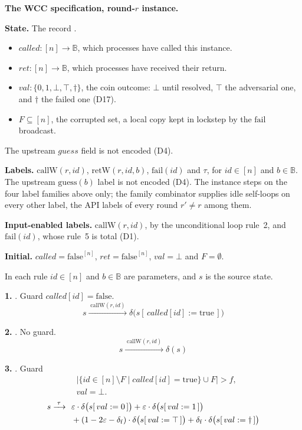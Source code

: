 \noindent\textbf{The WCC specification, round-$r$ instance.}

\medskip
\noindent\textbf{State.} The record .
\begin{itemize}
  \item $called : [n] \to \mathbb{B}$, which processes have called this instance.
  \item $ret : [n] \to \mathbb{B}$, which processes have received their return.
  \item $val : \{0,1,\bot,\top,\dagger\}$, the coin outcome: $\bot$ until resolved, $\top$ the adversarial one, and $\dagger$ the failed one (D17).
  \item $F \subseteq [n]$, the corrupted set, a local copy kept in lockstep by the $\mathrm{fail}$ broadcast.
\end{itemize}
\noindent The upstream $guess$ field is not encoded (D4).

\noindent\textbf{Labels.}
$\mathrm{callW}(r,id)$, $\mathrm{retW}(r,id,b)$, $\mathrm{fail}(id)$ and $\tau$, for $id \in [n]$ and $b \in \mathbb{B}$.
The upstream $\mathrm{guess}(b)$ label is not encoded (D4).
The instance steps on the four label families above only; the family combinator supplies idle self-loops on every other label, the API labels of every round $r' \neq r$ among them.

\noindent\textbf{Input-enabled labels.}
$\mathrm{callW}(r,id)$, by the unconditional loop rule~2, and $\mathrm{fail}(id)$, whose rule~5 is total (D1).

\noindent\textbf{Initial.}
$called = \mathrm{false}^{[n]}$, $ret = \mathrm{false}^{[n]}$, $val = \bot$ and $F = \emptyset$.

\medskip
\noindent In each rule $id \in [n]$ and $b \in \mathbb{B}$ are parameters, and $s$ is the source state.

\medskip
\noindent\textbf{1.} .
Guard $called[id] = \mathrm{false}$.
\[ s \xrightarrow{\;\mathrm{callW}(r,id)\;}
   \delta\bigl(s[\,called[id] := \mathrm{true}\,]\bigr) \]

\noindent\textbf{2.} .
No guard.
\[ s \xrightarrow{\;\mathrm{callW}(r,id)\;} \delta(s) \]

\noindent\textbf{3.} .
Guard
\[ \begin{aligned}
     &\bigl|\{id \in [n]\setminus F \mid called[id] = \mathrm{true}\} \cup F\bigr| > f,\\
     &val = \bot.
   \end{aligned} \]
\[ \begin{aligned}
     s \xrightarrow{\;\tau\;}\ \
     &\varepsilon\cdot\delta\bigl(s[\,val := 0\,]\bigr)
     + \varepsilon\cdot\delta\bigl(s[\,val := 1\,]\bigr)\\
     &{}+ (1-2\varepsilon-\delta_{\mathrm{f}})\cdot\delta\bigl(s[\,val := \top\,]\bigr)
     + \delta_{\mathrm{f}}\cdot\delta\bigl(s[\,val := \dagger\,]\bigr)
   \end{aligned} \]

